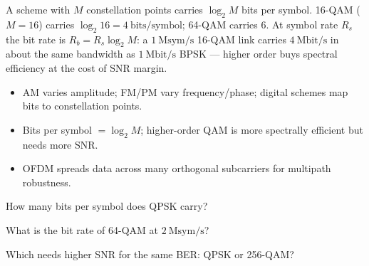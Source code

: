 \begin{workedexample}
A scheme with $M$ constellation points carries $\log_2 M$ bits per symbol.
16-QAM ($M = 16$) carries $\log_2 16 = 4\ \text{bits/symbol}$; 64-QAM carries 6. At
symbol rate $R_s$ the bit rate is $R_b = R_s\log_2 M$: a $1\ \text{Msym/s}$
16-QAM link carries $4\ \text{Mbit/s}$ in about the same bandwidth as
$1\ \text{Mbit/s}$ BPSK --- higher order buys spectral efficiency at the cost of
SNR margin.
\end{workedexample}

\begin{keytakeaways}
\begin{itemize}[leftmargin=1.4em,itemsep=2pt]
\item AM varies amplitude; FM/PM vary frequency/phase; digital schemes map bits to constellation points.
\item Bits per symbol $= \log_2 M$; higher-order QAM is more spectrally efficient but needs more SNR.
\item OFDM spreads data across many orthogonal subcarriers for multipath robustness.
\end{itemize}
\end{keytakeaways}

\begin{exercises}
\item How many bits per symbol does QPSK carry?
\item What is the bit rate of 64-QAM at $2\ \text{Msym/s}$?
\item Which needs higher SNR for the same BER: QPSK or 256-QAM?
\end{exercises}

